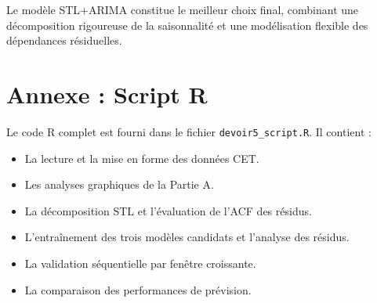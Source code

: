\documentclass[12pt,a4paper]{article}
\begin{document}
Le modèle STL+ARIMA constitue le meilleur choix final, combinant une décomposition rigoureuse de la saisonnalité et une modélisation flexible des dépendances résiduelles.

\appendix
\section*{Annexe : Script R}
Le code R complet est fourni dans le fichier \texttt{devoir5\_script.R}. Il contient :
\begin{itemize}
    \item La lecture et la mise en forme des données CET.
    \item Les analyses graphiques de la Partie A.
    \item La décomposition STL et l'évaluation de l'ACF des résidus.
    \item L'entraînement des trois modèles candidats et l'analyse des résidus.
    \item La validation séquentielle par fenêtre croissante.
    \item La comparaison des performances de prévision.
\end{itemize}
\end{document}
